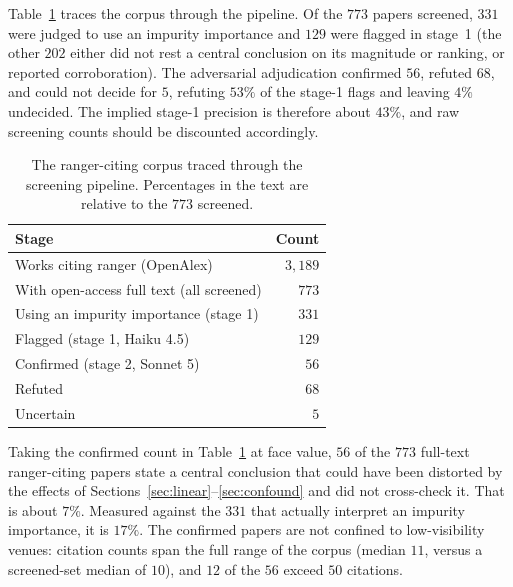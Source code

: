 Table~\ref{tab:prevalence} traces the corpus through the pipeline. Of the $773$
papers screened, $331$ were judged to use an impurity importance and $129$ were
flagged in stage~1 (the other $202$ either did not rest a central
conclusion on its magnitude or ranking, or reported corroboration). The adversarial adjudication confirmed $56$, refuted $68$,
and
could not decide for $5$, refuting $53\%$ of the stage-1 flags and leaving $4\%$
undecided. The
implied stage-1 precision is therefore about $43\%$, and raw screening counts
should be discounted accordingly.

\begin{table}[htb]
\centering
\caption{The ranger-citing corpus traced through the screening pipeline.
Percentages in the text are relative to the $773$ screened.}
\label{tab:prevalence}
\begin{tabular}{lr}
\toprule
Stage & Count \\
\midrule
Works citing ranger (OpenAlex) & $3{,}189$ \\
With open-access full text (all screened) & $773$ \\
\midrule
Using an impurity importance (stage 1) & $331$ \\
Flagged (stage 1, Haiku 4.5) & $129$ \\
\quad Confirmed (stage 2, Sonnet 5) & $56$ \\
\quad Refuted & $68$ \\
\quad Uncertain & $5$ \\
\bottomrule
\end{tabular}
\end{table}

Taking the confirmed count in Table~\ref{tab:prevalence} at face value, $56$ of
the $773$ full-text ranger-citing papers state a central conclusion that could
have been distorted by the effects of
Sections~\ref{sec:linear}--\ref{sec:confound} and did not cross-check it. That
is about $7\%$. Measured against the $331$ that actually interpret an impurity
importance, it is $17\%$.
%
The confirmed papers are not confined to low-visibility venues: citation counts
span the full range of the corpus (median $11$, versus a screened-set median of
$10$),
and $12$ of the $56$ exceed $50$ citations.

